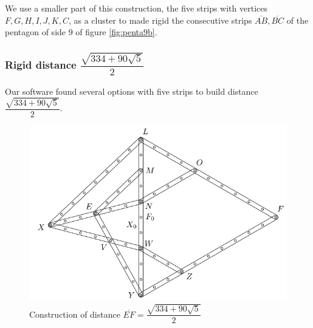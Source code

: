 \documentclass[11pt]{article}
\begin{document}
We use a smaller part of this construction, the five strips with vertices $F,G,H,I,J,K,C$, as a cluster to made rigid the consecutive strips $\overline{AB},\overline{BC}$ of the pentagon of side $9$ of figure \ref{fig:penta9b}.


\subsubsection{Rigid distance $\dfrac{\sqrt{334 + 90\sqrt5}}2$}

Our software found several options with five strips to build distance$\dfrac{\sqrt{334 + 90\sqrt5}}2$.

\begin{figure}[H]
\centering
\includegraphics[scale=1]{9/cluster9b2}
\caption{Construction of distance $\overline{EF}=\dfrac{\sqrt{334 + 90\sqrt5}}2$}
\label{fig:cluster9b2}
\end{figure}
\end{document}
